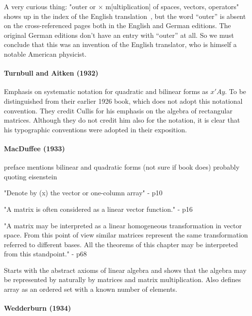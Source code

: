 A very curious thing: "outer or $\times$ m[ultiplication] of spaces, vectors, operators" shows up in the index of the English translation~\cite{Weyl1931}, but the word ``outer'' is absent on the cross-referenced pages both in the English and German editions. The original German editions don't have an entry with ``outer'' at all. So we must conclude that this was an invention of the English translator, who is himself a notable American physicist.


\paragraph{Turnbull and Aitken (1932)}

Emphasis on systematic notation for quadratic and bilinear forms as $x'Ay$.
To be distinguished from their earlier 1926 book, which does not adopt this notational convention.
They credit Cullis for his emphasis on the algebra of rectangular matrices. Although they do not credit him also for the notation, it is clear that his typographic conventions were adopted in their exposition.



\paragraph{MacDuffee (1933)~\cite{MacDuffee1933}}

preface mentions bilinear and quadratic forms (not sure if book does)
probably quoting eisenstein

"Denote by (x) the vector or one-column array" - p10

"A matrix is often considered as a linear vector function." - p16

"A matrix may be interpreted as a linear homogeneous transformation in
vector space. From this point of view similar matrices represent the
same transformation referred to different bases. All the theorems of
this chapter may be interpreted from this standpoint." - p68

Starts with the abstract axioms of linear algebra and shows that the algebra may be represented by naturally by matrices and matrix multiplication. Also defines array as an ordered set with a known number of elements.

\paragraph{Wedderburn (1934)~\cite{Wedderburn1934}}

